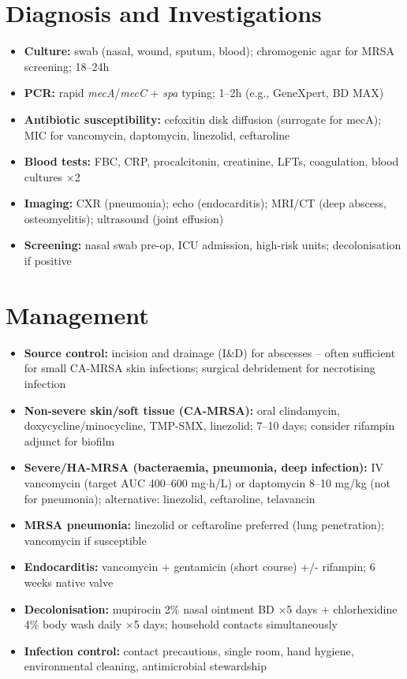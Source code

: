 \section*{Diagnosis and Investigations}
\begin{itemize}
    \item \textbf{Culture:} swab (nasal, wound, sputum, blood); chromogenic agar for MRSA screening; 18--24h
    \item \textbf{PCR:} rapid \textit{mecA}/\textit{mecC} + \textit{spa} typing; 1--2h (e.g., GeneXpert, BD MAX)
    \item \textbf{Antibiotic susceptibility:} cefoxitin disk diffusion (surrogate for mecA); MIC for vancomycin, daptomycin, linezolid, ceftaroline
    \item \textbf{Blood tests:} FBC, CRP, procalcitonin, creatinine, LFTs, coagulation, blood cultures $\times$2
    \item \textbf{Imaging:} CXR (pneumonia); echo (endocarditis); MRI/CT (deep abscess, osteomyelitis); ultrasound (joint effusion)
    \item \textbf{Screening:} nasal swab pre-op, ICU admission, high-risk units; decolonisation if positive
\end{itemize}

\section*{Management}
\begin{itemize}
    \item \textbf{Source control:} incision and drainage (I\&D) for abscesses -- often sufficient for small CA-MRSA skin infections; surgical debridement for necrotising infection
    \item \textbf{Non-severe skin/soft tissue (CA-MRSA):} oral clindamycin, doxycycline/minocycline, TMP-SMX, linezolid; 7--10 days; consider rifampin adjunct for biofilm
    \item \textbf{Severe/HA-MRSA (bacteraemia, pneumonia, deep infection):} IV vancomycin (target AUC 400--600 mg$\cdot$h/L) or daptomycin 8--10 mg/kg (not for pneumonia); alternative: linezolid, ceftaroline, telavancin
    \item \textbf{MRSA pneumonia:} linezolid or ceftaroline preferred (lung penetration); vancomycin if susceptible
    \item \textbf{Endocarditis:} vancomycin + gentamicin (short course) +/- rifampin; 6 weeks native valve
    \item \textbf{Decolonisation:} mupirocin 2\% nasal ointment BD $\times$5 days + chlorhexidine 4\% body wash daily $\times$5 days; household contacts simultaneously
    \item \textbf{Infection control:} contact precautions, single room, hand hygiene, environmental cleaning, antimicrobial stewardship
\end{itemize}

